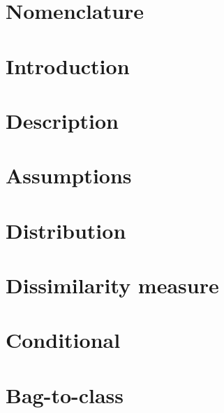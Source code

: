 \documentclass[preprint,12pt]{elsarticle}
\begin{document}
\newcommand{\cpos}{\text{\scriptsize{{\it POS}}}}
\newcommand{\cneg}{\text{\scriptsize{{\it NEG}}}}


\begin{frontmatter}







\end{frontmatter}

\clearpage
\section{Nomenclature} \label{sec:Nomenclature}


\clearpage

\section{Introduction} \label{sec:Introduction} 


\section{Description} \label{sec:Description}


\section{Assumptions} \label{sec:Assumptions}


\section{Distribution} \label{sec:Distribution}


\section{Dissimilarity measure} \label{sec:Dissimilarity}


\section{Conditional} \label{sec:Conditional}


\section{Bag-to-class} \label{sec:Bag_vs_Class}

\end{document}
